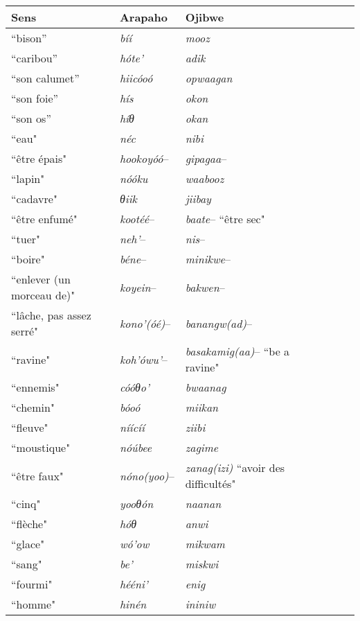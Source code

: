 \documentclass[twoside,a4paper,11pt]{article}
\newcommand{\ipa}[1]{{\phon\textit{#1}}}
\newcommand{\Σ}{\greek{Σ}}
\begin{document}
 \begin{table}[h]
\begin{tabular}{lllllll}
\toprule
Sens & Arapaho &  Ojibwe \\
\midrule
``bison'' & \ipa{bíí} & \textit{mooz} \\
``caribou'' & \ipa{hóte'} & \textit{adik} \\
``son calumet'' & \ipa{hiicóoó} & \textit{opwaagan} \\
``son foie'' & \ipa{hís} & \textit{okon} \\
``son  os'' & \ipa{híθ} & \textit{okan} \\
 ``eau" & \ipa{néc}     &  \textit{nibi} \\
  ``être épais" & \ipa{hookoyóó}--    &  \textit{gipagaa}-- \\
 ``lapin" & \ipa{nóóku}     &  \textit{waabooz} \\
  ``cadavre" & \ipa{θiik}    &  \textit{jiibay} \\
  ``être enfumé" & \ipa{kootéé}--    &  \textit{baate}-- ``être sec"\\
  ``tuer" & \ipa{neh'}--    &  \textit{nis}--  \\
    ``boire" & \ipa{béne}--    &  \textit{minikwe}--  \\
  ``enlever (un morceau de)" & \ipa{koyein}--    &  \textit{bakwen}-- \\
  ``lâche, pas assez serré" & \ipa{kono'(óé)}--    &  \textit{banangw(ad)}-- \\ 
 ``ravine" & \ipa{koh'ówu'}--    &  \textit{basakamig(aa)}-- ``be a ravine"\\ 
 ``ennemis" &   \ipa{cóóθo'}  & \ipa{bwaanag} \\
 ``chemin" & \ipa{bóoó} &  \ipa{miikan} \\
 ``fleuve" &  \ipa{níícíí}       &  \ipa{ziibi} \\
``moustique"  & \ipa{nóúbee}  &  \ipa{zagime} \\
``être faux"  & \ipa{nóno(yoo)}--   & \textit{zanag(izi)} ``avoir des difficultés"  \\
``cinq" & \ipa{yooθón} & \ipa{naanan} \\
``flèche" & \ipa{hóθ} &  \ipa{anwi} \\
``glace" & \ipa{wó'ow} &  \ipa{mikwam} \\
``sang" & \ipa{be'} &  \ipa{miskwi} \\
``fourmi" & \ipa{hééni'} &  \ipa{enig} \\
``homme" & \ipa{hinén} & \ipa{ininiw} \\

\end{tabular}
\end{table}
\end{document}
